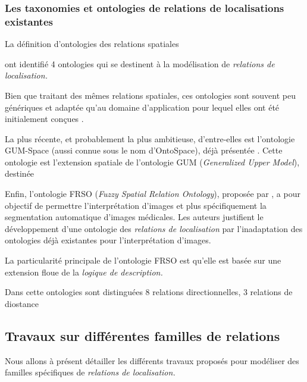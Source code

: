 
\subsubsection{Les taxonomies et ontologies de relations de localisations
  existantes}

La définition d'ontologies des relations spatiales

\textcite{Duchene2019} ont identifié 4 ontologies qui se destinent à
la modélisation de \emph{relations de localisation.}

Bien que traitant des mêmes relations spatiales, ces ontologies sont
souvent peu génériques et adaptée qu'au domaine d’application pour
lequel elles ont été initialement conçues \autocite{Hudelot2008a}.

La plus récente, et probablement la plus ambitieuse, d'entre-elles est
l'ontologie GUM-Space (aussi connue sous le nom d'OntoSpace), déjà
présentée \autocite{Bateman2010}.
%
Cette ontologie est l'extension spatiale de l'ontologie GUM
(\emph{Generalized Upper Model}), destinée




Enfin, l'ontologie FRSO (\emph{Fuzzy Spatial Relation Ontology}),
proposée par \textcite{Hudelot2008a}, a pour objectif de permettre
l’interprétation d'images et plus spécifiquement la segmentation
automatique d'images médicales. Les auteurs justifient le
développement d'une ontologie des \emph{relations de localisation} par
l'inadaptation des ontologies déjà existantes pour l'interprétation
d'images.

La particularité principale de l'ontologie FRSO est qu'elle est basée
sur une extension floue de la \emph{logique de description.}

Dans cette ontologies sont distinguées 8 relations directionnelles, 3
relations de diostance




\subsection{Travaux sur différentes familles de relations}


Nous allons à présent détailler les différents travaux proposés pour
modéliser des familles spécifiques de \emph{relations de
  localisation.}



